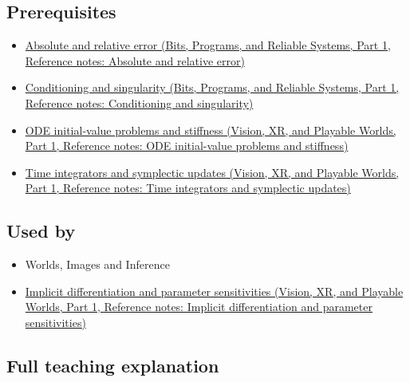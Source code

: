 \subsection{Prerequisites}\label{appendix-18eacf61a04b-prerequisites}

\hypertarget{appendix-18eacf61a04b-prerequisites}{}

\begin{itemize}
\tightlist
\item
  \href{../01-Bits-Programs-and-Reliable-Systems-P01/main.pdf\#appendix-3ae74e89b4e6}{Absolute and relative error (Bits, Programs, and Reliable Systems, Part 1, Reference notes: Absolute and relative error)}
\item
  \href{../01-Bits-Programs-and-Reliable-Systems-P01/main.pdf\#appendix-8f6a01f284a7}{Conditioning and singularity (Bits, Programs, and Reliable Systems, Part 1, Reference notes: Conditioning and singularity)}
\item
  \href{../07-Vision-XR-and-Playable-Worlds-P01/main.pdf\#appendix-e8ab9836882e}{ODE initial-value problems and stiffness (Vision, XR, and Playable Worlds, Part 1, Reference notes: ODE initial-value problems and stiffness)}
\item
  \href{../07-Vision-XR-and-Playable-Worlds-P01/main.pdf\#appendix-8f96f9c4d5bc}{Time integrators and symplectic updates (Vision, XR, and Playable Worlds, Part 1, Reference notes: Time integrators and symplectic updates)}
\end{itemize}

\subsection{Used by}\label{appendix-18eacf61a04b-used-by}

\hypertarget{appendix-18eacf61a04b-used-by}{}

\begin{itemize}
\tightlist
\item
  {Worlds, Images and Inference}
\item
  \href{../07-Vision-XR-and-Playable-Worlds-P01/main.pdf\#appendix-8836553d56fc}{Implicit differentiation and parameter sensitivities (Vision, XR, and Playable Worlds, Part 1, Reference notes: Implicit differentiation and parameter sensitivities)}
\end{itemize}

\subsection{Full teaching explanation}\label{appendix-18eacf61a04b-full-teaching-explanation}

